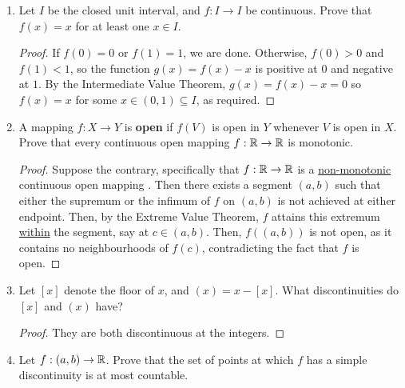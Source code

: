\begin{enumerate}
\begin{proof}
Let $\{x_n\}$ and $\{y_n\}$ be two sequences which converge to $x \in X$, and let $\epsilon > 0$ be arbitrary. We wish to show that $\lim_{n \to \infty} d_Y(f(x_n), f(y_n)) < \epsilon$. Now since $f$ is uniformly continuous, there exists some $\delta > 0$ such that if $d_X(x_n, y_n) < \delta$, then $d_Y(f(x_n), f(y_n)) < \epsilon$. Since $x_n, y_n \to x$, we can choose $N \in \N$ sufficiently large so that $d_X(x_n, x), d_X(y_n, x) < \delta / 2$, such that $d_X(x_n, y_n) \overset{\Delta}{<} \delta$, and thus $d_Y(f(x_n), f(y_n)) < \epsilon$. The result follows. 
\end{proof}

\item %
Let $I$ be the closed unit interval, and $f: I \to I$ be continuous. Prove that $f(x) = x$ for at least one $x \in I$.
\begin{proof}
    If $f(0) = 0$ or $f(1) = 1$, we are done. Otherwise, $f(0) > 0$ and $f(1) < 1$, so the function $g(x) = f(x) - x$ is positive at $0$ and negative at $1$. By the Intermediate Value Theorem, $g(x) = f(x) - x = 0$ so $f(x) = x$ for some $x \in (0, 1) \subseteq I$, as required.
\end{proof}

\item %
A mapping $f: X \to Y$ is \textbf{open} if $f(V)$ is open in $Y$ whenever $V$ is open in $X$. Prove that every continuous open mapping $f: \mathbb{R} \rightarrow \mathbb{R}$ is monotonic.

\begin{proof}
    Suppose the contrary, specifically that $f: \mathbb{R} \rightarrow \mathbb{R}$ is a \underline{non-monotonic} continuous open mapping . Then there exists a segment $(a, b)$ such that either the supremum or the infimum of $f$ on $(a, b)$ is not achieved at either endpoint. Then, by the Extreme Value Theorem, $f$ attains this extremum \underline{within} the segment, say at $c \in (a, b)$. Then, $f((a, b))$ is not open, as it contains no neighbourhoods of $f(c)$, contradicting the fact that $f$ is open.
\end{proof}

\item %
Let $[x]$ denote the floor of $x$, and $(x) = x - [x]$. What discontinuities do $[x]$ and $(x)$ have?
\begin{proof}
They are both discontinuous at the integers.
\end{proof}

\item %
Let $f: (a, b) \rightarrow \mathbb{R}$. Prove that the set of points at which $f$ has a simple discontinuity is at most countable.


\end{enumerate}
